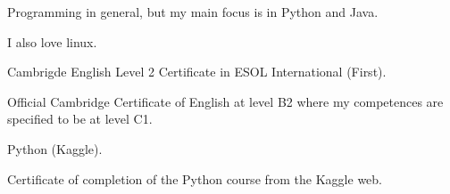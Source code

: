 











Programming in general, but my main focus is in Python and Java.

I also love linux.

{\large \faCertificate \color{emphasis} \hspace{2mm} Cambrigde English Level 2 Certificate in ESOL International (First).}

Official Cambridge Certificate of English at level B2 where my competences are specified to be at level C1.
\vspace{5mm}

{\large \faCertificate \color{emphasis} \hspace{2mm} Python (Kaggle).}

Certificate of completion of the Python course from the Kaggle web.

 


%
